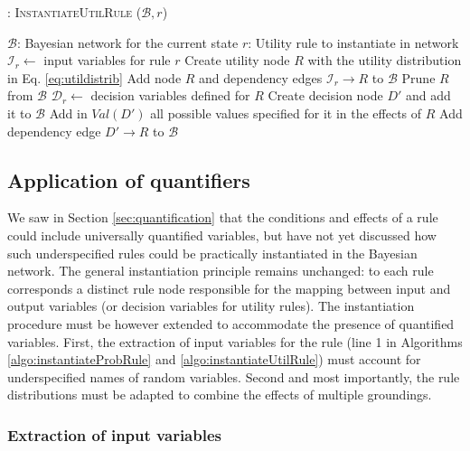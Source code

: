 \begin{algorithm}[h!]
\caption{: \textsc{InstantiateUtilRule} ($\mathcal{B}, r$)}
\begin{algorithmic}[1] \vspace{1mm}
\REQUIRE $\mathcal{B}$: Bayesian network for the current state
\REQUIRE $r$: Utility rule to instantiate in network  \vspace{1mm}
\STATE $\mathcal{I}_{r} \leftarrow $ input variables for rule $r$
\STATE Create utility node $R$ with the utility distribution in Eq. \eqref{eq:utildistrib}
\STATE Add node $R$ and dependency edges $\mathcal{I}_{r} \rightarrow R$ to $\mathcal{B}$ 
\STATE Prune $R$ from $\mathcal{B}$
\ELSE
\STATE $\mathcal{D}_{r} \leftarrow$ decision variables defined for $R$
\STATE Create decision node $D'$ and add it to $\mathcal{B}$
\ENDIF
\STATE Add in $Val(D')$ all possible values specified for it in the effects of $R$
\STATE Add dependency edge $D' \rightarrow R$ to $\mathcal{B}$ 
\ENDFOR
\ENDIF
\end{algorithmic}
\label{algo:instantiateUtilRule}
\end{algorithm}

\subsection{Application of quantifiers}
\label{sec:applicationquantif}

We saw in Section \ref{sec:quantification} that the conditions and effects of a rule could include universally quantified variables, but have not yet discussed how such underspecified rules could be practically instantiated in the Bayesian network. The general instantiation principle remains unchanged: to each rule corresponds a distinct rule node responsible for the mapping between input and output variables (or decision variables for utility rules). The instantiation procedure must be however extended to accommodate the presence of quantified variables. First, the extraction of input variables for the rule (line 1 in Algorithms \ref{algo:instantiateProbRule} and \ref{algo:instantiateUtilRule}) must account for underspecified names of random variables. Second and most importantly, the rule distributions must be adapted to combine the effects of multiple groundings. 

\subsubsection*{Extraction of input variables}

